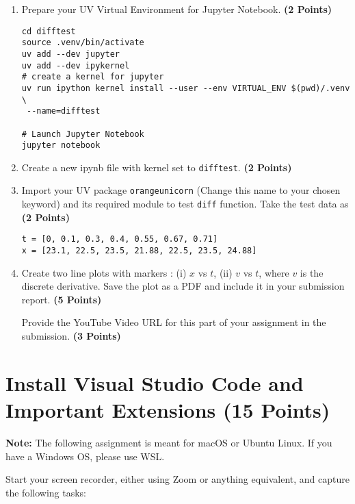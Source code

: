 \documentclass[12pt, xcolor=dvipsnames,svgnames,x11names]{article}
\begin{document}
\begin{enumerate}
\item Prepare your UV Virtual Environment for Jupyter Notebook. \hfill \textbf{(2 Points)}

\begin{verbatim}
cd difftest
source .venv/bin/activate
uv add --dev jupyter
uv add --dev ipykernel
# create a kernel for jupyter
uv run ipython kernel install --user --env VIRTUAL_ENV $(pwd)/.venv \
 --name=difftest

# Launch Jupyter Notebook
jupyter notebook
\end{verbatim}

\item Create a new ipynb file with kernel set to \texttt{difftest}. \hfill \textbf{(2 Points)}
\item Import your UV package \texttt{orangeunicorn} (Change this name to your chosen keyword) and its required module to test \texttt{diff} function. Take the test data as \hfill \textbf{(2 Points)}


\begin{verbatim}
t = [0, 0.1, 0.3, 0.4, 0.55, 0.67, 0.71]
x = [23.1, 22.5, 23.5, 21.88, 22.5, 23.5, 24.88]
\end{verbatim}

\item Create two line plots with markers : (i) $x$ vs $t$, (ii) $v$ vs $t$, where $v$ is the discrete derivative. Save the plot as a PDF and include it in your submission report. \hfill \textbf{(5 Points)}

Provide the YouTube Video URL for this part of your assignment in the submission. \hfill \textbf{(3 Points)}

\end{enumerate}

\section{Install Visual Studio Code and Important Extensions (15 Points)}

\textbf{Note:} The following assignment is meant for macOS or Ubuntu Linux. If you have a Windows OS, please use WSL.

Start your screen recorder, either using Zoom or anything equivalent, and capture the following tasks:
\end{document}
